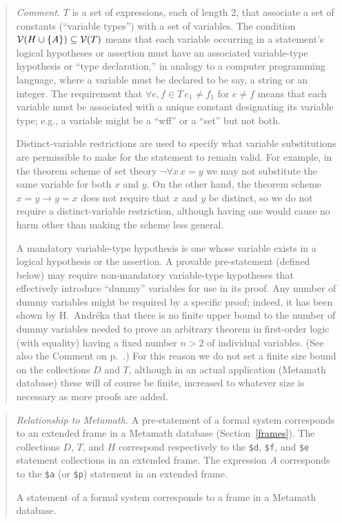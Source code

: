 {\footnotesize\begin{quotation}
{\em Comment.}  $T$ is a set of expressions, each of length 2, that associate
a set of constants (``variable types'') with a set of variables.  The
condition ${\cal V}(H\cup\{A\}) \subseteq {\cal V}(T) $
means that each variable occurring in a statement's logical
hypotheses or assertion must have an associated variable-type hypothesis or
``type declaration,'' in  analogy to a computer programming language, where a
variable must be declared to be say, a string or an integer.  The requirement
that $\forall e,f\in T \, e_1 \ne f_1$ for $e\neq f$
means that each variable must be
associated with a unique constant designating its variable type; e.g., a
variable might be a ``wff'' or a ``set'' but not both.

Distinct-variable restrictions are used to specify what variable substitutions
are permissible to make for the statement to remain valid.  For example, in
the theorem scheme of set theory $\lnot\forall x\,x=y$ we may not substitute
the same variable for both $x$ and $y$.  On the other hand, the theorem scheme
$x=y\to y=x$ does not require that $x$ and $y$ be distinct, so we do not
require a distinct-variable restriction, although having one
would cause no harm other than making the scheme less general.

A mandatory variable-type hypothesis is one whose variable exists in a logical
hypothesis or the assertion.  A provable pre-statement
(defined below) may require
non-mandatory variable-type hypotheses that effectively introduce ``dummy''
variables for use in its proof.  Any number of dummy variables might
be required by a specific proof; indeed, it has been shown by H.\
Andr\'{e}ka \cite{Nemeti} that there is no finite
upper bound to the number of dummy variables needed to prove an arbitrary
theorem in first-order logic (with equality) having a fixed number $n>2$ of
individual variables.  (See also the Comment on p.~\pageref{nodd}.)
For this reason we do not set a finite size bound on the collections $D$ and
$T$, although in an actual application (Metamath database) these will of
course be finite, increased to whatever size is necessary as more
proofs are added.
\end{quotation}}

{\footnotesize\begin{quotation}
{\em Relationship to Metamath.} A pre-statement of a formal system
corresponds to an extended frame in a Metamath database
(Section~\ref{frames}).  The collections $D$, $T$, and $H$ correspond
respectively to the \texttt{\$d}, \texttt{\$f}, and \texttt{\$e}
statement collections in an extended frame.  The expression $A$
corresponds to the \texttt{\$a} (or \texttt{\$p}) statement in an
extended frame.

A statement of a formal system corresponds to a frame in a Metamath
database.
\end{quotation}}


